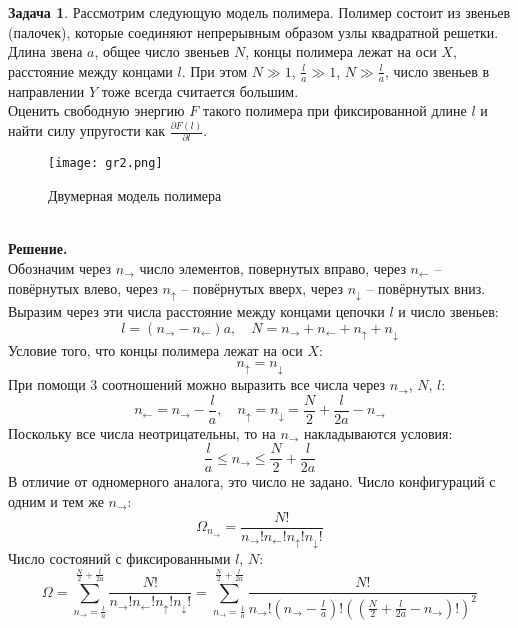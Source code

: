 \documentclass[12pt]{article}
\theoremstyle{definition}
\newtheorem{zad}{Задача}[section]
\begin{document}
\begin{zad}
Рассмотрим следующую модель полимера. Полимер состоит из звеньев (палочек), которые соединяют непрерывным образом узлы квадратной решетки. Длина звена $a$, общее число звеньев $N$, концы полимера лежат на оси $X$, расстояние между концами $l$. При этом $N\gg1$, $\frac{l}{a}\gg1$, $N\gg\frac{l}{a}$, число звеньев в направлении $Y$ тоже всегда считается большим.\\
Оценить свободную энергию $F$ такого полимера при фиксированной длине $l$ и найти силу упругости как $\frac{\partial F(l)}{\partial l}$.
\begin{figure}[h!]\label{gr2}
    \centering
    \texttt{[image: gr2.png]}
    \caption{Двумерная модель полимера}
    \label{fig:my_label}
\end{figure}\\
\textbf{Решение.}\\
Обозначим через $n_\rightarrow$ число элементов, повернутых вправо, через $n_\leftarrow$ -- повёрнутых влево, через $n_\uparrow$ -- повёрнутых вверх, через $n_\downarrow$ -- повёрнутых вниз. Выразим через эти числа расстояние между концами цепочки $l$ и число звеньев:
\begin{equation}
    l=(n_\rightarrow-n_\leftarrow)a,\quad N=n_\rightarrow+n_\leftarrow+n_\uparrow+n_\downarrow
\end{equation}
Условие того, что концы полимера лежат на оси $X$:
\begin{equation}
    n_\uparrow=n_\downarrow
\end{equation}
При помощи 3 соотношений можно выразить все числа через $n_\rightarrow$, $N$, $l$:
\begin{equation}
    n_\leftarrow=n_\rightarrow-\frac{l}{a},\quad n_\uparrow=n_\downarrow=\frac{N}{2}+\frac{l}{2a}-n_\rightarrow
\end{equation}
Поскольку все числа неотрицательны, то на $n_\rightarrow$ накладываются условия:
\begin{equation}
    \frac{l}{a}\leq n_\rightarrow\leq\frac{N}{2}+\frac{l}{2a}
\end{equation}
В отличие от одномерного аналога, это число не задано. Число конфигураций с одним и тем же $n_\rightarrow$:
\begin{equation}
    \Omega_{n_\rightarrow}=\frac{N!}{n_\rightarrow!n_\leftarrow!n_\uparrow! n_\downarrow!}
\end{equation}
Число состояний с фиксированными $l$, $N$:
\begin{equation}
    \Omega=\sum\limits_{n_\rightarrow=\frac{l}{a}}^{\frac{N}{2}+\frac{l}{2a}}\frac{N!}{n_\rightarrow!n_\leftarrow!n_\uparrow! n_\downarrow!}=\sum\limits_{n_\rightarrow=\frac{l}{a}}^{\frac{N}{2}+\frac{l}{2a}}\frac{N!}{n_\rightarrow!(n_\rightarrow-\frac{l}{a})!((\frac{N}{2}+\frac{l}{2a}-n_\rightarrow)!)^2}

\end{equation}
\end{zad}
\end{document}
